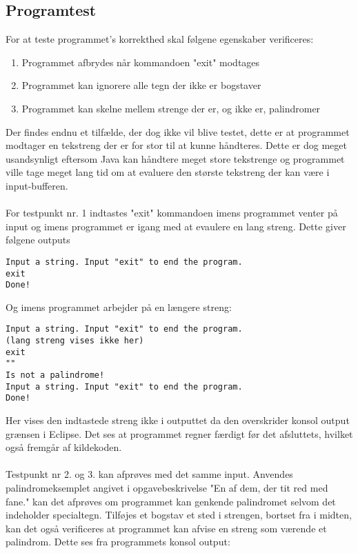 \subsection{Programtest}
	For at teste programmet's korrekthed skal følgene egenskaber verificeres:
	\begin{enumerate}
		\item Programmet afbrydes når kommandoen "exit" modtages
		\item Programmet kan ignorere alle tegn der ikke er bogstaver
		\item Programmet kan skelne mellem strenge der er, og ikke er, palindromer
	\end{enumerate}
	Der findes endnu et tilfælde, der dog ikke vil blive testet, dette er at programmet modtager en tekstreng der er for stor til at kunne håndteres. Dette er dog meget usandsynligt eftersom Java kan håndtere meget store tekstrenge og programmet ville tage meget lang tid om at evaluere den største tekstreng der kan være i input-bufferen. \\
	\\
	For testpunkt nr. 1 indtastes "exit" kommandoen imens programmet venter på input og imens programmet er igang med at evaulere en lang streng. Dette giver følgene outputs
	\begin{lstlisting}[caption=Output fra testsekvens]
Input a string. Input "exit" to end the program.
exit
Done!
	\end{lstlisting}
	Og imens programmet arbejder på en længere streng:
	\begin{lstlisting}[caption=Output fra testsekvens imens programmet evaluerer]
Input a string. Input "exit" to end the program.
(lang streng vises ikke her)
exit
""
Is not a palindrome!
Input a string. Input "exit" to end the program.
Done!
	\end{lstlisting}
	Her vises den indtastede streng ikke i outputtet da den overskrider konsol output grænsen i Eclipse. Det ses at programmet regner færdigt før det afsluttets, hvilket også fremgår af kildekoden.\\
	\\
	Testpunkt nr 2. og 3. kan afprøves med det samme input. Anvendes palindromeksemplet angivet i opgavebeskrivelse "En af dem, der tit red med fane." kan det afprøves om programmet kan genkende palindromet selvom det indeholder specialtegn. Tilføjes et bogstav et sted i strengen, bortset fra i midten, kan det også verificeres at programmet kan afvise en streng som værende et palindrom. Dette ses fra programmets konsol output:
